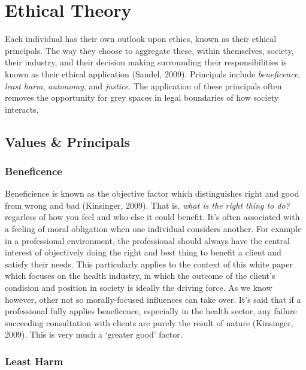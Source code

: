 \documentclass[11pt, english]{article}
\begin{document}
\newpage

\section{Ethical Theory}

	Each individual has their own outlook upon ethics, known as their ethical principals. The way they choose to aggregate these, within themselves, society, their industry, and their decision making surrounding their responsibilities is known as their ethical application (Sandel, 2009). Principals include \textit{beneficence}, \textit{least harm}, \textit{autonomy}, and \textit{justice}. The application of these principals often removes the opportunity for grey spaces in legal boundaries of how society interacts.

	\subsection{Values \& Principals}

		\subsubsection{Beneficence}

	Beneficience is known as the objective factor which distinguishes right and good from wrong and bad (Kinsinger, 2009). That is, \textit{what is the right thing to do?} regarless of how you feel and who else it could benefit. It's often associated with a feeling of moral obligation when one individual considers another. For example in a professional environment, the professional should always have the central interest of objectively doing the right and best thing to benefit a client and satisfy their needs. This particularly applies to the context of this white paper which focuses on the health industry, in which the outcome of the client's condision and position in society is ideally the driving force. As we know however, other not so morally-focused influences can take over. It's said that if a professional fully applies beneficence, especially in the health sector, any failure succeeding consultation with clients are purely the result of nature (Kinsinger, 2009). This is very much a `greater good' factor.

		\subsubsection{Least Harm}
\end{document}
